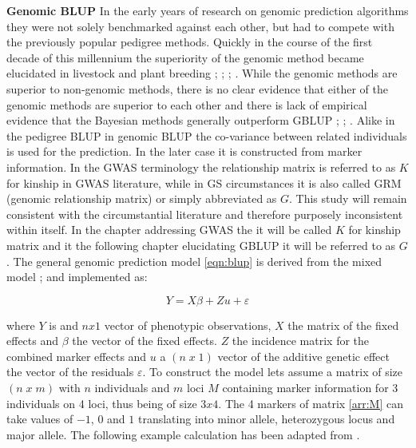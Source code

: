 \textbf{Genomic BLUP} \newline In the early years of research on genomic prediction algorithms they were not
solely benchmarked against each other, but had to compete with the previously popular pedigree
methods. Quickly in the course of the first decade of this millennium the superiority of the genomic method
became elucidated in livestock and plant breeding \cite{habier2007impact}; \cite{vanraden2008efficient};
\cite{vanraden2008reliability}; \cite{harris2009genomic}.  While the genomic methods are superior to
non-genomic methods, there is no clear evidence that either of the genomic methods are superior to each other
and there is lack of empirical evidence that the Bayesian methods generally outperform GBLUP
\cite{moser2009comparison} ; \cite{bernardo2010breeding}; \cite{azodi2019}.  Alike in the pedigree BLUP in
genomic BLUP the co-variance between related individuals is used for the prediction. In the later case it is
constructed from marker information. In the GWAS terminology the relationship matrix is referred to as $K$ for
kinship in GWAS literature, while in GS circumstances it is also called GRM (genomic relationship matrix) or
simply abbreviated as $G$. This study will remain consistent with the circumstantial literature and therefore
purposely inconsistent within itself. In the chapter addressing GWAS the it will be called $K$ for kinship
matrix and it the following chapter elucidating GBLUP it will be referred to as $G$.  The general genomic
prediction model \ref{eqn:blup} is derived from the mixed model \cite{henderson1975best};
\cite{vanraden2008efficient} and implemented as:

\begin{equation}
Y = X \beta  +  Zu + \varepsilon
  \label{eqn:blup}
\end{equation}

where $Y$ is and $nx1$ vector of phenotypic observations, $X$ the matrix of the fixed effects and $\beta$ the
vector of the fixed effects. $Z$ the incidence matrix for the combined marker effects and $u$ a $(n\; x\; 1)$ vector
of the additive genetic effect the vector of the residuals $\varepsilon$.  To construct the model lets assume
a matrix of size $(n\; x\; m)$ with $n$ individuals and $m$ loci $M$ containing marker information for 3
individuals on 4 loci, thus being of size $3x4$. The 4 markers of matrix \ref{arr:M} can take values of $-1$,
$0$ and $1$ translating into minor allele, heterozygous locus and major allele. The following example
calculation has been adapted from \cite{isik2013}.

